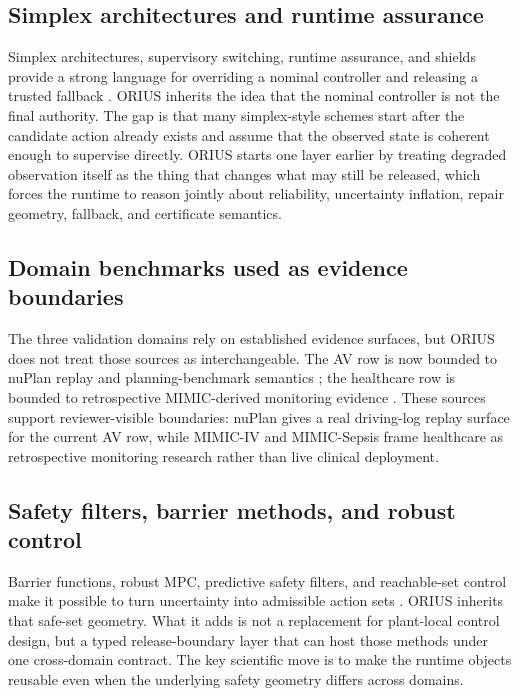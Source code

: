 \subsection{Simplex architectures and runtime assurance}
Simplex architectures, supervisory switching, runtime assurance, and shields provide a
strong language for overriding a nominal controller and releasing a trusted fallback
\cite{sha1998simplex,sha2001using,desai2019soter,bloem2015shield,leucker2009brief,kwon2025adaptive}.
ORIUS inherits the idea that the nominal controller is not the final authority. The gap
is that many simplex-style schemes start after the candidate action already exists and
assume that the observed state is coherent enough to supervise directly. ORIUS starts
one layer earlier by treating degraded observation itself as the thing that changes what
may still be released, which forces the runtime to reason jointly about reliability,
uncertainty inflation, repair geometry, fallback, and certificate semantics.

\subsection{Domain benchmarks used as evidence boundaries}
The three validation domains rely on established evidence surfaces, but ORIUS does
not treat those sources as interchangeable. The AV row is now bounded to nuPlan replay
and planning-benchmark semantics \cite{caesar2021nuplan,karnchanachari2024nuplan,peng2025nuplanr};
the healthcare row is bounded to retrospective MIMIC-derived monitoring evidence
\cite{johnson2023mimiciv,physionet2024mimiciv31,huang2025mimicsepsis}. These sources
support reviewer-visible boundaries: nuPlan gives a real driving-log replay surface for
the current AV row, while MIMIC-IV and MIMIC-Sepsis frame healthcare as retrospective
monitoring research rather than live clinical deployment.

\subsection{Safety filters, barrier methods, and robust control}
Barrier functions, robust MPC, predictive safety filters, and reachable-set control
make it possible to turn uncertainty into admissible action sets
\cite{ames2019control,ames2014cbf,wabersich2021predictive,fisac2019general,mayne2005robust,langson2004tubes,rawlings2017mpc,camacho2013model}.
ORIUS inherits that safe-set geometry. What it adds is not a replacement for plant-local
control design, but a typed release-boundary layer that can host those methods under one
cross-domain contract. The key scientific move is to make the runtime objects reusable
even when the underlying safety geometry differs across domains.

